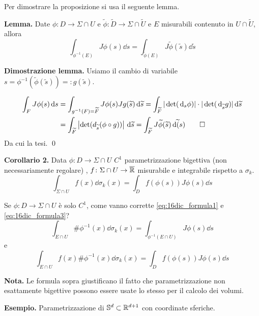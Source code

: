 Per dimostrare la proposizione si usa il seguente lemma.

\textbf{Lemma.} Date $\phi \colon D \to \Sigma \cap U$ e $\tilde{\phi} \colon \tilde{D} \to \Sigma \cap \tilde{U}$ e $E$ misurabili contenuto in $U \cap \tilde{U}$, allora
%
\begin{equation}
	\label{eq:16dic_formula2} \tag{2}
	\int_{\phi^{-1}(E)} J\phi(s) \dd s = \int_{\tilde{\phi}(E)} J\tilde{\phi}(\tilde{s}) \dd \tilde{s}
\end{equation}
%

\textbf{Dimostrazione lemma.} Usiamo il cambio di variabile $s = \phi^{-1}(\tilde{\phi}(\tilde{s})) =: g(\tilde{s})$.

\begin{align*}
	\int_F J\phi(s) \,\mathrm{d} s & = \int_{g^{-1}(F) = \widetilde{F}} J\phi(s) Jg(\widetilde{s}) \,\mathrm{d} \widetilde{s}
	= \int_{\widetilde{F}} |\det(\,\mathrm{d}_s \phi)| \cdot | \det(\,\mathrm{d}_{\widetilde{s}}g)| \,\mathrm{d} \widetilde{s} \\
	& = \int_{\widetilde{F}} \left| \det (d_{\widetilde{s}}(\phi \circ g)) \right| \,\mathrm{d} \widetilde{s}
	= \int_{\widetilde{F}} J \widetilde{\phi}(\widetilde{s}) \,\mathrm{d} \widetilde(s)
\qed
\end{align*}
%
Da cui la tesi.
\qed

\textbf{Corollario 2.} Data $\phi \colon D \to \Sigma \cap U$ $C^1$ parametrizzazione bigettiva (non necessariamente regolare) , $f \colon \Sigma \cap U \to \overline{\mathbb R}$ misurabile e integrabile rispetto a $\sigma_k$.
%
\begin{equation}
	\label{eq:16dic_formula3} \tag{3}
	\int_{\Sigma \cap U} f(x) \dd \sigma_k(x) = \int_D f(\phi(s)) J\phi(s) \dd s
\end{equation}

Se $\phi \colon D \to \Sigma \cap U$ è solo $C^1$, come vanno corrette \eqref{eq:16dic_formula1} e \eqref{eq:16dic_formula3}?
\begin{equation}
	\tag{1'}
	\int_{E \cap U} \# \phi^{-1}(x) \dd \sigma_k(x) = \int_{\phi^{-1}(E \cap U)} J\phi(s) \dd s
\end{equation}
e
\begin{equation}
	\tag{3'}
	\int_{E \cap U} f(x) \# \phi^{-1}(x) \dd \sigma_k (x) = \int_D f(\phi(s)) J\phi(s) \dd s
\end{equation}

\textbf{Nota.} Le formula sopra giustificano il fatto che parametrizzazione non esattamente bigettive possono essere usate lo stesso per il calcolo dei volumi.

\textbf{Esempio.} Parametrizzazione di $\mathbb{S}^d \subset \mathbb R^{d+1}$ con coordinate sferiche.

